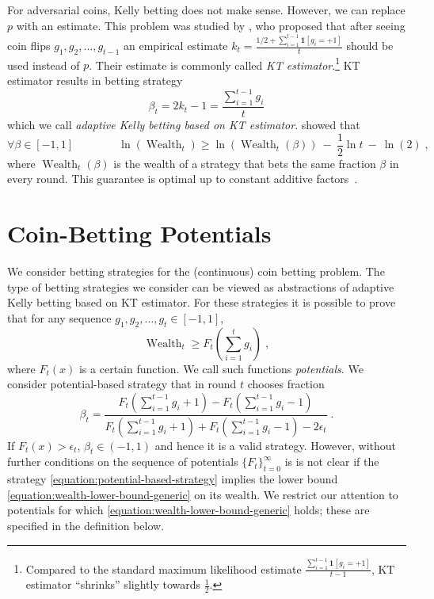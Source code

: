 \documentclass{colt2016_empty} %
\DeclareMathOperator{\Wealth}{Wealth}
\newcommand{\indicator}{\mathbf{1}}
\begin{document}
For adversarial coins, Kelly betting does not make sense. However, we can
replace $p$ with an estimate. This problem was studied by \citet{KrichevskyT81},
who proposed that after seeing coin flips $g_1, g_2, \dots, g_{t-1}$ an
empirical estimate $k_t = \frac{1/2 + \sum_{i=1}^{t-1} \indicator[g_i = +1]}{t}$
should be used instead of $p$. Their estimate is commonly called \emph{KT
estimator}.\footnote{Compared to the standard maximum likelihood estimate
$\frac{\sum_{i=1}^{t-1} \indicator[g_i = +1]}{t-1}$, KT estimator ``shrinks''
slightly towards $\frac{1}{2}$.} KT estimator results in betting strategy
\begin{equation}
\label{equation:kt-estimator-betting-strategy}
\beta_t = 2k_t - 1 = \frac{\sum_{i=1}^{t-1} g_i}{t}
\end{equation}
which we call \emph{adaptive Kelly betting based on KT estimator}.
\citeauthor{KrichevskyT81} showed that
$$
\forall \beta \in [-1,1] \qquad \qquad \ln(\Wealth_t) \ge \ln(\Wealth_t(\beta)) \ - \ \frac{1}{2} \ln t \ - \ \ln(2) \; ,
$$
where $\Wealth_t(\beta)$ is the wealth of a strategy that bets the same fraction
$\beta$ in every round. This guarantee is optimal up to constant additive factors~\citep{Cesa-BianchiL06}.


\section{Coin-Betting Potentials}
\label{section:coin-betting-potentials}

We consider betting strategies for the (continuous) coin betting problem. The
type of betting strategies we consider can be viewed as abstractions of
adaptive Kelly betting based on KT estimator. For these strategies it is
possible to prove that for any sequence $g_1, g_2, \dots, g_t \in [-1,1]$,
\begin{equation}
\label{equation:wealth-lower-bound-generic}
\Wealth_t \ge F_t \left( \sum_{i=1}^t g_i \right)\; ,
\end{equation}
where $F_t(x)$ is a certain function. We call such functions \emph{potentials}.
We consider potential-based strategy that in round $t$ chooses fraction
\begin{equation}
\label{equation:potential-based-strategy}
\beta_t = \frac{F_t(\sum_{i=1}^{t-1} g_i + 1) - F_t(\sum_{i=1}^{t-1} g_i - 1)}{F_t(\sum_{i=1}^{t-1} g_i + 1) + F_t(\sum_{i=1}^{t-1} g_i - 1) -2 \epsilon_t} \; .
\end{equation}
If $F_t(x)>\epsilon_t$, $\beta_t \in (-1,1)$ and hence it is a valid
strategy. However, without further conditions on the sequence of potentials
$\{F_t\}_{t=0}^\infty$ is is not clear if the strategy
\eqref{equation:potential-based-strategy} implies the lower bound
\eqref{equation:wealth-lower-bound-generic} on its wealth. We restrict our
attention to potentials for which \eqref{equation:wealth-lower-bound-generic}
holds; these are specified in the definition below.
\end{document}
